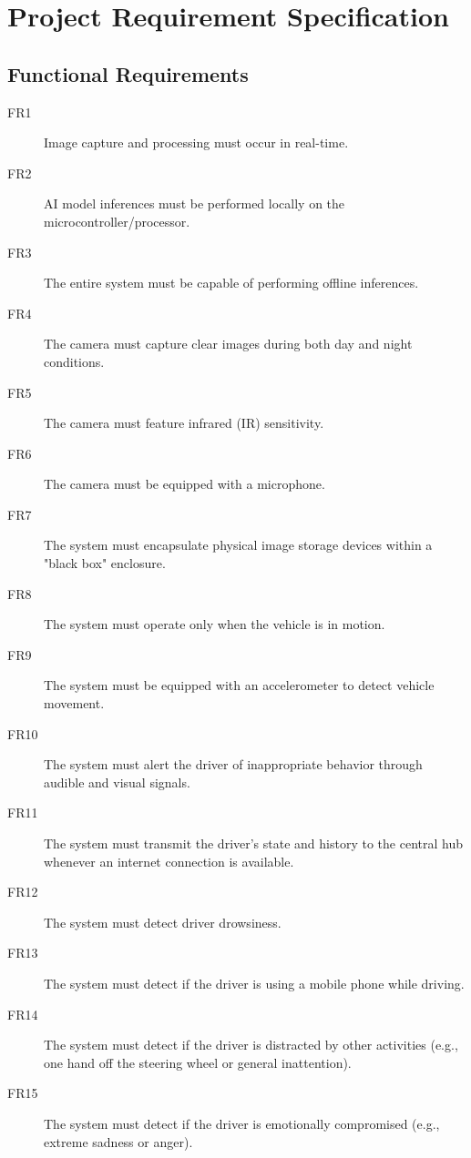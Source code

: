 \chapter{Project Requirement Specification} \label{cap:especificacao}


\section*{Functional Requirements}

\begin{description}
    \item[FR1] Image capture and processing must occur in real-time.
    \item[FR2] AI model inferences must be performed locally on the microcontroller/processor.
    \item[FR3] The entire system must be capable of performing offline inferences.
    \item[FR4] The camera must capture clear images during both day and night conditions.
    \item[FR5] The camera must feature infrared (IR) sensitivity.
    \item[FR6] The camera must be equipped with a microphone.
    \item[FR7] The system must encapsulate physical image storage devices within a "black box" enclosure.
    \item[FR8] The system must operate only when the vehicle is in motion.
    \item[FR9] The system must be equipped with an accelerometer to detect vehicle movement.
    \item[FR10] The system must alert the driver of inappropriate behavior through audible and visual signals.
    \item[FR11] The system must transmit the driver's state and history to the central hub whenever an internet connection is available.
    \item[FR12] The system must detect driver drowsiness.
    \item[FR13] The system must detect if the driver is using a mobile phone while driving.
    \item[FR14] The system must detect if the driver is distracted by other activities (e.g., one hand off the steering wheel or general inattention).
    \item[FR15] The system must detect if the driver is emotionally compromised (e.g., extreme sadness or anger).

\end{description}
